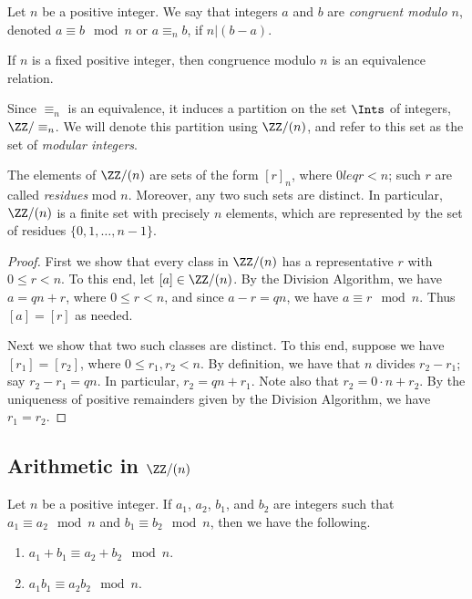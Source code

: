 \documentclass{article}
\begin{document}

\begin{dfn}
Let $n$ be a positive integer. We say that integers $a$ and $b$ are \emph{congruent modulo $n$}, denoted $a \equiv b \mod n$ or $a \equiv_n b$, if $n|(b-a)$.
\end{dfn}

\begin{prop}
If $n$ is a fixed positive integer, then congruence modulo $n$ is an equivalence relation. 
\end{prop}

Since $\equiv_n$ is an equivalence, it induces a partition on the set $\Ints$ of integers, $\ZZ/\equiv_n$. We will denote this partition using $\ZZ/(n)$, and refer to this set as the set of \emph{modular integers}.

\begin{thm}
The elements of $\ZZ/(n)$ are sets of the form $[r]_n$, where $0 leq r < n$; such $r$ are called \emph{residues} mod $n$. Moreover, any two such sets are distinct. In particular, $\ZZ/(n)$ is a finite set with precisely $n$ elements, which are represented by the set of residues $\{0,1,\ldots,n-1\}$. 
\end{thm}

\begin{proof}
First we show that every class in $\ZZ/(n)$ has a representative $r$ with $0 \leq r < n$. To this end, let $[a] \in \ZZ/(n)$. By the Division Algorithm, we have $a = qn + r$, where $0 \leq r < n$, and since $a - r = qn$, we have $a \equiv r \mod n$. Thus $[a] = [r]$ as needed.

Next we show that two such classes are distinct. To this end, suppose we have $[r_1] = [r_2]$, where $0 \leq r_1, r_2 < n$. By definition, we have that $n$ divides $r_2 - r_1$; say $r_2 - r_1 = qn$. In particular, $r_2 = qn + r_1$. Note also that $r_2 = 0 \cdot n + r_2$. By the uniqueness of positive remainders given by the Division Algorithm, we have $r_1 = r_2$.
\end{proof}



\subsection*{Arithmetic in $\ZZ/(n)$}

\begin{thm}
Let $n$ be a positive integer. If $a_1$, $a_2$, $b_1$, and $b_2$ are integers such that $a_1 \equiv a_2 \mod n$ and $b_1 \equiv b_2 \mod n$, then we have the following.
\begin{enumerate}
\item $a_1 + b_1 \equiv a_2 + b_2 \mod n$.
\item $a_1 b_1 \equiv a_2 b_2 \mod n$.
\end{enumerate}
\end{thm}
\end{document}
